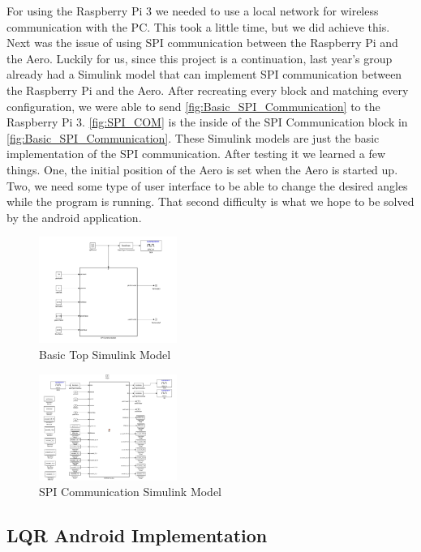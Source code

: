 \documentclass[letterpaper, 10pt, conference]{ieeeconf}
\begin{document}
For using the Raspberry Pi 3 we needed to use a local network for wireless communication with the PC.  This took a little time, but we did achieve this.  Next was the issue of using SPI communication between the Raspberry Pi and the Aero.  Luckily for us, since this project is a continuation, last year's group already had a Simulink model that can implement SPI communication between the Raspberry Pi and the Aero.  After recreating every block and matching every configuration, we were able to send \autoref{fig:Basic_SPI_Communication} to the Raspberry Pi 3.  \autoref{fig:SPI_COM} is the inside of the SPI Communication block in \autoref{fig:Basic_SPI_Communication}.  These Simulink models are just the basic implementation of the SPI communication.  After testing it we learned a few things.  One, the initial position of the Aero is set when the Aero is started up.  Two, we need some type of user interface to be able to change the desired angles while the program is running.  That second difficulty is what we hope to be solved by the android application.

\begin{figure}
  \centering
  \includegraphics[width=0.4\textwidth]{figs/img/Basic_SPI_Communication}
  \caption{Basic Top Simulink Model}
  \label{fig:Basic_SPI_Communication}
\end{figure}

\begin{figure}
  \centering
  \includegraphics[width=0.4\textwidth]{figs/img/SPI_COM}
  \caption{SPI Communication Simulink Model}
  \label{fig:SPI_COM}
\end{figure}

\subsection{LQR Android Implementation} \label{sec:LQR_And_imp}
\end{document}

